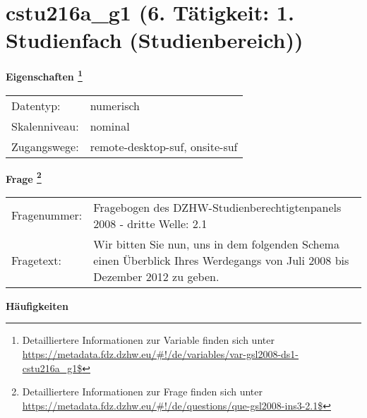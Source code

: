 
    \setcounter{footnote}{0}

    \vspace*{-1.8cm}
	\section{cstu216a\_g1 (6. Tätigkeit: 1. Studienfach (Studienbereich))}
	\label{section:cstu216a_g1}



    \vspace*{0.5cm}
    \noindent\textbf{Eigenschaften
	\footnote{Detailliertere Informationen zur Variable finden sich unter
		\url{https://metadata.fdz.dzhw.eu/\#!/de/variables/var-gsl2008-ds1-cstu216a_g1$}}}\\
	\begin{tabularx}{\hsize}{@{}lX}
	Datentyp: & numerisch \\
	Skalenniveau: & nominal \\
	Zugangswege: &
	  remote-desktop-suf, 
	  onsite-suf
 \\
    \end{tabularx}



				\vspace*{0.5cm}
                \noindent\textbf{Frage
	                \footnote{Detailliertere Informationen zur Frage finden sich unter
		              \url{https://metadata.fdz.dzhw.eu/\#!/de/questions/que-gsl2008-ins3-2.1$}}}\\
				\begin{tabularx}{\hsize}{@{}lX}
					Fragenummer: &
					  Fragebogen des DZHW-Studienberechtigtenpanels 2008 - dritte Welle:
					  2.1
 \\
					Fragetext: & Wir bitten Sie nun, uns in dem folgenden Schema einen Überblick Ihres Werdegangs von Juli 2008 bis Dezember 2012 zu geben. \\
				\end{tabularx}





        		\vspace*{0.5cm}
                \noindent\textbf{Häufigkeiten}

